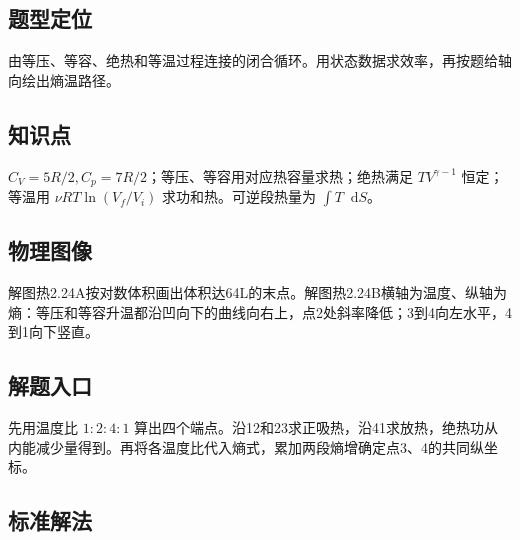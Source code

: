 \documentclass[UTF8,fontset=fandol,a4paper,11pt]{ctexart}
\newcommand{\dd}{\mathop{}\!\mathrm{d}}
\begin{document}


\subsection*{题型定位}

由等压、等容、绝热和等温过程连接的闭合循环。用状态数据求效率，再按题给轴向绘出熵温路径。



\subsection*{知识点}

$C_V=5R/2,C_p=7R/2$；等压、等容用对应热容量求热；绝热满足 $TV^{\gamma-1}$ 恒定；等温用 $\nu RT\ln(V_f/V_i)$ 求功和热。可逆段热量为 $\int T\dd S$。




\subsection*{物理图像}

解图热2.24A按对数体积画出体积达64L的末点。解图热2.24B横轴为温度、纵轴为熵：等压和等容升温都沿凹向下的曲线向右上，点2处斜率降低；3到4向左水平，4到1向下竖直。



\subsection*{解题入口}

先用温度比 $1:2:4:1$ 算出四个端点。沿12和23求正吸热，沿41求放热，绝热功从内能减少量得到。再将各温度比代入熵式，累加两段熵增确定点3、4的共同纵坐标。




\subsection*{标准解法}
\end{document}
